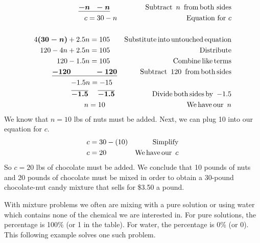 \begin{example}
\begin{eqnarray*}
    \boldsymbol{\underline{- n ~~- n}}~~~ &  &\operatorname{Subtract~} n
    \operatorname{~from} \operatorname{both~sides}\\
    c = 30 - n &  & \text{Equation~for~} c\\
    &  & \\
    4 \boldsymbol{(30 - n)} + 2.5 n = 105~~~ &  & \operatorname{Substitute} \operatorname{into}
    \operatorname{untouched} \operatorname{equation}\\
    120 - 4 n + 2.5 n = 105~~~ &  & \operatorname{Distribute}\\
    120 - 1.5 n = 105~~~ &  & \operatorname{Combine} \operatorname{like} \operatorname{terms}\\
    \boldsymbol{\underline{- 120 ~~~~~~~~~~- 120}} &  & \operatorname{Subtract~} 120 \operatorname{~from} \operatorname{both}
    \operatorname{sides}\\
    - 1.5 n = - 15~~ &  &\\
    \boldsymbol{\overline{- 1.5} ~~~~ \overline{- 1.5}}~ &  &  \operatorname{Divide} \operatorname{both} \operatorname{sides} \operatorname{by~} -
    1.5\\
    n = 10~~~~~ &  & \operatorname{We} \operatorname{have} \operatorname{our~} n
		\end{eqnarray*}
		We know that $n=10$ lbs of nuts must be added.  Next, we can plug 10 into our equation for $c$.		
		\begin{eqnarray*}
    c = 30 - (10) &  & \text{Simplify}\\
    c = 20~~~~~~~~~ &  & \operatorname{We} \operatorname{have} \operatorname{our~} c
		\end{eqnarray*}
		So $c=20$ lbs of chocolate must be added.  We conclude that 10 pounds of nuts and 20 pounds of chocolate must be mixed in order to obtain a 30-pound chocolate-nut candy mixture that sells for \$3.50 a pound.
\end{example}

With mixture problems we often are mixing with a pure solution or using water
which contains none of the chemical we are interested in. For pure solutions,
the percentage is 100\% (or 1 in the table). For water, the percentage is 0\% (or 0).
This following example solves one such problem.

